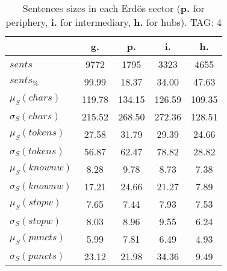 \begin{table}[h!]
\begin{center}
\begin{tabular}{| l | c | c | c | c |}\hline
 & g. & p. & i. & h. \\\hline
$sents$ & 9772  & 1795  & 3323  & 4655 \\\hline
$sents_{\%}$ & 99.99  & 18.37  & 34.00  & 47.63 \\\hline
$\mu_S(chars)$ & 119.78  & 134.15  & 126.59  & 109.35 \\\hline
$\sigma_S(chars)$ & 215.52  & 268.50  & 272.36  & 128.51 \\\hline
$\mu_S(tokens)$ & 27.58  & 31.79  & 29.39  & 24.66 \\\hline
$\sigma_S(tokens)$ & 56.87  & 62.47  & 78.82  & 28.82 \\\hline
$\mu_S(knownw)$ & 8.28  & 9.78  & 8.73  & 7.38 \\\hline
$\sigma_S(knownw)$ & 17.21  & 24.66  & 21.27  & 7.89 \\\hline
$\mu_S(stopw)$ & 7.65  & 7.44  & 7.93  & 7.53 \\\hline
$\sigma_S(stopw)$ & 8.03  & 8.96  & 9.55  & 6.24 \\\hline
$\mu_S(puncts)$ & 5.99  & 7.81  & 6.49  & 4.93 \\\hline
$\sigma_S(puncts)$ & 23.12  & 21.98  & 34.36  & 9.49 \\\hline
\end{tabular}
\caption{Sentences sizes in each Erd\"os sector ({{\bf p.}} for periphery, {{\bf i.}} for intermediary, {{\bf h.}} for hubs). TAG: 4}
\end{center}
\end{table}